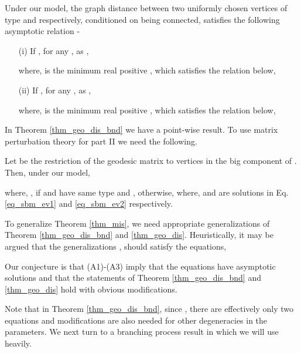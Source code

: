 \documentclass[graybox]{svmult}
\begin{document}
\begin{theorem}
\label{thm_geo_dis_bnd}
Under our model, the graph distance  between two uniformly chosen vertices of type  and  respectively, conditioned on being connected, satisfies the following asymptotic relation -
\begin{itemize}
\item[(i)] If , for any , as , 

where,  is the minimum real positive , which satisfies the relation below,

\item[(ii)] 
If , for any , as , 

where,  is the minimum real positive , which satisfies the relation below, 

\end{itemize}
\end{theorem}


In Theorem \ref{thm_geo_dis_bnd} we have a point-wise result. To use matrix perturbation theory for part II we need the following.
\begin{theorem}
\label{thm_geo_dis}
Let  be the restriction of the geodesic matrix to vertices in the big component of . Then, under our model, 

where, , if  and  have same type and , otherwise, where,  and  are solutions  in Eq. \eqref{eq_sbm_ev1} and \eqref{eq_sbm_ev2} respectively.
\end{theorem}
To generalize Theorem \ref{thm_mis}, we need appropriate generalizations of Theorem \ref{thm_geo_dis_bnd} and \ref{thm_geo_dis}. Heuristically, it may be argued that the generalizations ,  should satisfy the equations,

Our conjecture is that (A1)-(A3) imply that the equations have asymptotic solutions and that the statements of Theorem \ref{thm_geo_dis_bnd} and \ref{thm_geo_dis} hold with obvious modifications.

Note that in Theorem \ref{thm_geo_dis_bnd}, since ,  there are effectively only two equations and modifications are also needed for other degeneracies in the parameters. We next turn to a branching process result in \cite{bordenave2015non} which we will use heavily.  
\end{document}
